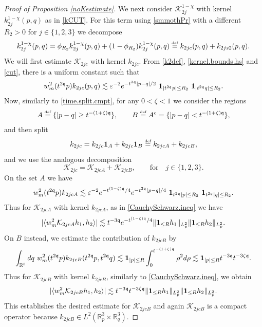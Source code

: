 \documentclass[reqno]{amsart}
\newcommand{\eqdef }{\overset{\mbox{\tiny{def}}}{=}}
\newcommand{\pv}{p}
\newcommand{\threed}{{\mathbb R}^3}
\newcommand{\qq}{\mathfrak{q}}
\newcommand{\tqq}{t^{2\qq}}
\newcommand{\tmTq}{t^{-3\qq}}
\newcommand{\compK}{\mathcal{K}}
\newcommand{\smep}{\varepsilon}
\newcommand{\ind}{{\bf 1}}
\newcommand{\spr}{\zeta}
\theoremstyle{definition}
\numberwithin{equation}{section}
\numberwithin{theorem}{section}
\begin{document}
\begin{proof}[Proof of Proposition \ref{noKestimate}]
We next consider $\compK_{2j}^{1-\chi}$ with kernel $k_{2j}^{1-\chi}(p,q)$ as in \eqref{kCUT}.  For this term using \eqref{smmothPr} with a different $R_2>0$ for $j \in \{1, 2, 3\}$ we decompose 
\begin{equation}\notag
k_{2j}^{1-\chi}(p,q) = \phi_{R_2} k_{2j}^{1-\chi}(p,q) + (1-\phi_{R_2})k_{2j}^{1-\chi}(p,q) \eqdef k_{2jc}(p,q)+k_{2js2}(p,q).
\end{equation}
We will first estimate $\compK_{2jc}$ with kernel $k_{2jc}$.  From \eqref{k2def}, \eqref{kernel.bounds.hs} and \eqref{cut}, there is a uniform constant such that 
\begin{align*}
    w_{m}^2(\tqq \pv)  k_{2jc}(p,q) 
\lesssim \smep^{-2} e^{- \tqq|p-q|/2} ~ \ind_{|\tqq p|\le R_2} ~ \ind_{|\tqq q|\le R_2}.
\end{align*}
Now, similarly to \eqref{time.split.cmpt}, for any $0< \spr < 1$ we consider the regions
\begin{align}\notag
  A \eqdef \{   |p-q| \geq t^{-(1+\spr)\qq}\}, \qquad B \eqdef A^c = \{   |p-q| < t^{-(1+\spr)\qq}\},
\end{align}
and then split \[k_{2jc}= k_{2jc}\ind_A+k_{2jc}\ind_B\eqdef k_{2jcA}+k_{2jcB},\]
and we use the analogous decomposition \[\mathcal{K}_{2jc}=\mathcal{K}_{2jcA}+\mathcal{K}_{2jcB},\qquad \text{for}\quad j\in\{1,2,3\}.\]
On the set $A$ we have 
\begin{align*}
    w_{m}^2(\tqq \pv)  k_{2jcA} 
\lesssim \smep^{-2} e^{- t^{(1-\spr)\qq}/4} e^{- \tqq|p-q|/4} ~ \ind_{\tqq|p|\le R_2} ~ \ind_{\tqq|q|\le R_2}.
\end{align*}
Thus for $\compK_{2jcA}$ with kernel $k_{2jcA}$, as in \eqref{CauchySchwarz.ineq} we have
\begin{align*}
    |\langle w_{m}^2 \compK_{2jcA} h_1, h_2\rangle |
\lesssim
\tmTq e^{-t^{(1-\spr)\qq}/4}\|\ind_{\le R} h_1 \|_{L^2_p} \| \ind_{\le R} h_2 \|_{L^2_p}.
\end{align*}
On $B$ instead, we estimate the contribution of $k_{2jcB}$ by 
\begin{align*}
\int_{\mathbb{R}^3}dq ~
w_{m}^2(\tqq \pv) k_{2jcB}(\tqq p,\tqq q)
\lesssim \ind_{|p|\le R} \int_0^{t^{-(1+\spr)\qq}} \rho^2 d\rho  
\lesssim \ind_{|p|\le R} t^{-3\qq} t^{-3\spr\qq}.
\end{align*}
 Thus for $\compK_{2jcB}$ with kernel $k_{2jcB}$, similarly to \eqref{CauchySchwarz.ineq}, we obtain
\begin{align*}
    |\langle w_{m}^2 \compK_{2jcB} h_1, h_2\rangle |
\lesssim
\tmTq  t^{-3\spr\qq}\|\ind_{\le R} h_1 \|_{L^2_p} \| \ind_{\le R} h_2 \|_{L^2_p}.
\end{align*}
This establishes the desired estimate for $\compK_{2jcB}$ and again $\compK_{2jcB}$ is a compact operator because  $k_{2jcB} \in L^2(\threed_p\times \threed_q)$.




\end{proof}
\end{document}
